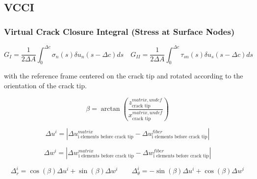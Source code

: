 \documentclass[first,firstsupp,lastsupp,handout,last,hyperref,table]{ETHclass}
\begin{document}
\subsection{VCCI}

\begin{frame}
\frametitle{\small Virtual Crack Closure Integral (Stress at Surface Nodes)}
\vspace{-0.7cm}
\tiny
\centering
\captionsetup[figure]{font=scriptsize,labelfont=scriptsize}

\begin{equation}
G_{I}=\frac{1}{2\Delta A}\int_{0}^{\Delta c}\sigma_{n}\left(s\right)\delta u_{n}\left(s-\Delta c\right)ds\quad G_{II}=\frac{1}{2\Delta A}\int_{0}^{\Delta c}\tau_{sn}\left(s\right)\delta u_{s}\left(s-\Delta c\right)ds
\end{equation}

with the reference frame centered on the crack tip and rotated according to the orientation of the crack tip.

\begin{equation}
\beta=\arctan{\left(\frac{z^{matrix, undef}_{\text{crack tip}}}{x^{matrix, undef}_{\text{crack tip}}}\right)}
\end{equation}

\begin{equation}
\Delta u^{i} =\left|\Delta u^{matrix}_{\text{i elements before crack tip}}-\Delta u^{fiber}_{\text{i elements before crack tip}}\right|
\end{equation}

\begin{equation}
\Delta w^{i} =\left|\Delta w^{matrix}_{\text{i elements before crack tip}}-\Delta w^{fiber}_{\text{i elements before crack tip}}\right|
\end{equation}

\begin{equation}
\Delta_{r}^{i}=\cos{\left(\beta\right)}\Delta u^{i}+\sin{\left(\beta\right)}\Delta w^{i}\qquad\Delta_{\theta}^{i}=-\sin{\left(\beta\right)}\Delta u^{i}+\cos{\left(\beta\right)}\Delta w^{i}
\end{equation}

\end{frame}
\end{document}
